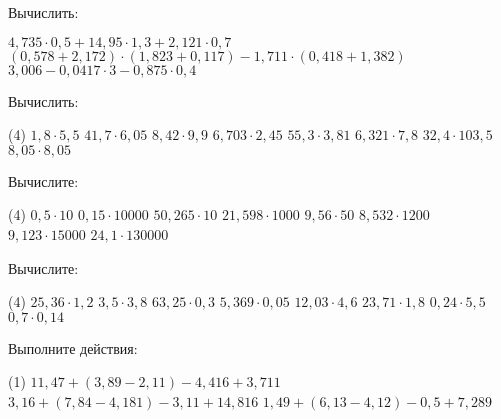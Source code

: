 \begin{class}[number=7]
	\begin{listofex}
		\item Вычислить:
		\begin{tasks}
			\task \( 4,735\cdot0,5+14,95\cdot1,3+2,121\cdot0,7 \)
			\task \( (0,578+2,172)\cdot(1,823+0,117)-1,711\cdot(0,418+1,382) \)
			\task \( 3,006-0,0417\cdot3-0,875\cdot0,4 \)
		\end{tasks}
		\item Вычислить:
		\begin{tasks}(4)
			\task \( 1,8\cdot5,5 \)
			\task \( 41,7\cdot6,05 \)
			\task \( 8,42\cdot9,9 \)
			\task \( 6,703\cdot2,45 \)
			\task \( 55,3\cdot3,81 \)
			\task \( 6,321\cdot7,8 \)
			\task \( 32,4\cdot103,5 \)
			\task \( 8,05\cdot8,05 \)
		\end{tasks}
		\item Вычислите:
		\begin{tasks}(4)
			\task \( 0,5\cdot10 \)
			\task \( 0,15\cdot10000 \)
			\task \( 50,265\cdot10 \)
			\task \( 21,598\cdot1000 \)
			\task \( 9,56\cdot50 \)
			\task \( 8,532\cdot1200 \)
			\task \( 9,123\cdot15000 \)
			\task \( 24,1\cdot130000 \)
		\end{tasks}

	\end{listofex}
\end{class}

\begin{exam}
	\begin{listofex}
		\item Вычислите:
		\begin{tasks}(4)
			\task \( 25,36\cdot1,2 \)
			\task \( 3,5\cdot3,8 \)
			\task \( 63,25\cdot0,3 \)
			\task \( 5,369\cdot0,05 \)
			\task \( 12,03\cdot4,6 \)
			\task \( 23,71\cdot1,8 \)
			\task \( 0,24\cdot5,5 \)
			\task \( 0,7\cdot0,14 \)
		\end{tasks}
		\item Выполните действия:
		\begin{tasks}(1)
			\task \( 11,47+(3,89-2,11)-4,416+3,711 \)
			\task \( 3,16+(7,84-4,181)-3,11+14,816 \)
			\task \( 1,49+(6,13-4,12)-0,5+7,289 \)
		\end{tasks}
	\end{listofex}
\end{exam}
